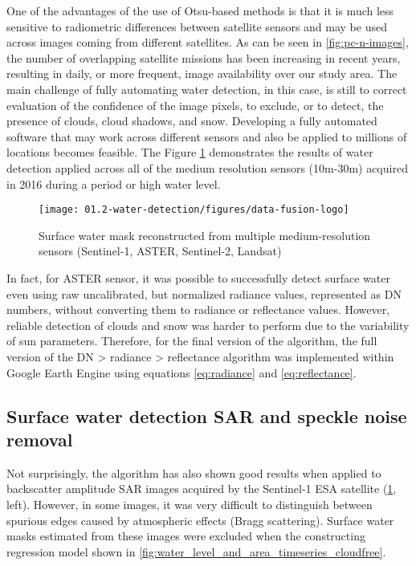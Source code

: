 One of the advantages of the use of Otsu-based methods is that it is much less sensitive to radiometric differences between satellite sensors and may be used across images coming from different satellites. As can be seen in \ref{fig:pc-n-images}, the number of overlapping satellite missions has been increasing in recent years, resulting in daily, or more frequent, image availability over our study area. The main challenge of fully automating water detection, in this case, is still to correct evaluation of the confidence of the image pixels, to exclude, or to detect, the presence of clouds, cloud shadows, and snow. Developing a fully automated software that may work across different sensors and also be applied to millions of locations becomes feasible. The Figure \ref{fig:multiple-sensors} demonstrates the results of water detection applied across all of the medium resolution sensors (10m-30m) acquired in 2016 during a period or high water level.

\begin{figure}[H]
	\texttt{[image: 01.2-water-detection/figures/data-fusion-logo]}
	\caption{Surface water mask reconstructed from multiple medium-resolution sensors (Sentinel-1, ASTER, Sentinel-2, Landsat)}
	\label{fig:multiple-sensors}
\end{figure}

In fact, for ASTER sensor, it was possible to successfully detect surface water even using raw uncalibrated, but normalized radiance values, represented as DN numbers, without converting them to radiance or reflectance values. However, reliable detection of clouds and snow was harder to perform due to the variability of sun parameters. Therefore, for the final version of the algorithm, the full version of the DN > radiance > reflectance algorithm was implemented within Google Earth Engine using equations \ref{eq:radiance} and \ref{eq:reflectance}.

\subsection{Surface water detection SAR and speckle noise removal}

Not surprisingly, the algorithm has also shown good results when applied to backscatter amplitude SAR images acquired by the Sentinel-1 ESA satellite (\ref{fig:multiple-sensors}, left). However, in some images, it was very difficult to distinguish between spurious edges caused by atmospheric effects (Bragg scattering). Surface water masks estimated from these images were excluded when the constructing regression model shown in \ref{fig:water_level_and_area_timeseries_cloudfree}.

